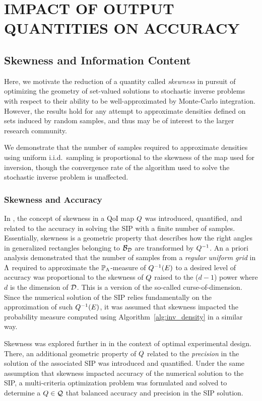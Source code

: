 \chapter{\uppercase{Impact of Output Quantities on Accuracy} \label{chapter:03}}

\section{Skewness and Information Content}
Here, we motivate the reduction of a quantity called \emph{skewness} in pursuit of optimizing the geometry of set-valued solutions to stochastic inverse problems with respect to their ability to be well-approximated by Monte-Carlo integration. 
However, the results hold for any attempt to approximate densities defined on sets induced by random samples, and thus may be of interest to the larger research community. 

We demonstrate that the number of samples required to approximate densities using uniform i.i.d.~sampling is proportional to the skewness of the map used for inversion, though the convergence rate of the algorithm used to solve the stochastic inverse problem is unaffected. 



\subsection{Skewness and Accuracy}\label{subsec:skewness}
In \cite{BGE+15}, the concept of skewness in a QoI map $Q$ was introduced, quantified, and related to the accuracy in solving the SIP with a finite number of samples.
Essentially, skewness is a geometric property that describes how the right angles in generalized rectangles belonging to $\mathcal{B}_{\mathcal{D}}$ are transformed by $Q^{-1}$. 
An a priori analysis demonstrated that the number of samples from a {\em regular uniform grid} in ${\Lambda}$ required to approximate the $\mathbb{P}_{\Lambda}$-measure of $Q^{-1}(E)$ to a desired level of accuracy was proportional to the skewness of $Q$ raised to the ($d-1$) power where $d$ is the dimension of $\mathcal{D}$.
This is a version of the so-called curse-of-dimension.
Since the numerical solution of the SIP relies fundamentally on the approximation of such $Q^{-1}(E)$, it was assumed that skewness impacted the probability measure computed using Algorithm~\ref{alg:inv_density} in a similar way.

Skewness was explored further in \cite{BPW17} in the context of optimal experimental design.
There, an additional geometric property of $Q$ related to the {\em precision} in the solution of the associated SIP was introduced and quantified. 
Under the same assumption that skewness impacted accuracy of the numerical solution to the SIP, a multi-criteria optimization problem was formulated and solved to determine a $Q\in\mathcal{Q}$ that balanced accuracy and precision in the SIP solution.

